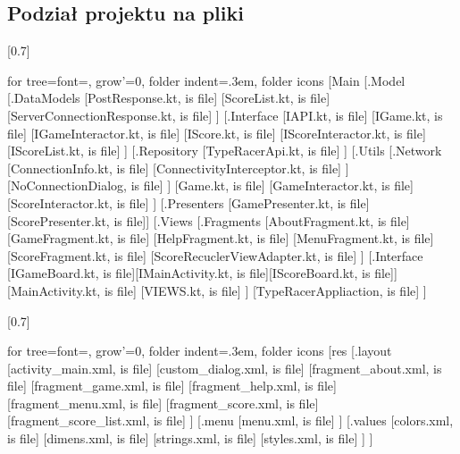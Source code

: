 \documentclass[12pt,a4paper]{article}
\begin{document}
		\subsection{Podział projektu na pliki}
		\begin{multicols}{2}
\scalebox{0.7}[0.7]{
			\begin{forest}
				for tree={font=\sffamily, grow'=0,
    folder indent=.3em, folder icons}
    	[Main
    	    [.Model
    	        [.DataModels
    	        [PostResponse.kt, is file]
    	        [ScoreList.kt, is file]
    	        [ServerConnectionResponse.kt, is file]
    	        ]
    	        [.Interface
    	        [IAPI.kt, is file]
    	        [IGame.kt, is file]
    	        [IGameInteractor.kt, is file]
    	        [IScore.kt, is file]
    	        [IScoreInteractor.kt, is file]
    	        [IScoreList.kt, is file]
    	        ]
    	        [.Repository
    	        [TypeRacerApi.kt, is file]
    	        ]
    	        [.Utils
    	            [.Network
    	            [ConnectionInfo.kt, is file]
    	            [ConnectivityInterceptor.kt, is file]
    	            ]
    	        [NoConnectionDialog, is file]
    	        ]
    	        [Game.kt, is file]
    	        [GameInteractor.kt, is file]
    	        [ScoreInteractor.kt, is file]
    	    ]
    	    [.Presenters
    	    [GamePresenter.kt, is file][ScorePresenter.kt, is file]]
    	    [.Views
    	    [.Fragments
    	    [AboutFragment.kt, is file]
    	    [GameFragment.kt, is file]
    	    [HelpFragment.kt, is file]
    	    [MenuFragment.kt, is file]
    	    [ScoreFragment.kt, is file]
    	    [ScoreRecuclerViewAdapter.kt, is file]
    	    ]
    	    [.Interface [IGameBoard.kt, is file][IMainActivity.kt, is file][IScoreBoard.kt, is file]]
    	    [MainActivity.kt, is file]
    	    [VIEWS.kt, is file]
    	    ]
    	    [TypeRacerAppliaction, is file]
    	]
			\end{forest}
			}
\scalebox{0.7}[0.7]{
			\begin{forest}
				for tree={font=\sffamily, grow'=0,
                folder indent=.3em, folder icons}
    [res
        [.layout 
            [activity\_main.xml, is file]
            [custom\_dialog.xml, is file]
            [fragment\_about.xml, is file]
            [fragment\_game.xml, is file]
            [fragment\_help.xml, is file]
            [fragment\_menu.xml, is file]
            [fragment\_score.xml, is file]
            [fragment\_score\_list.xml, is file]
        ]
        [.menu 
            [menu.xml, is file]
        ]
        [.values
            [colors.xml, is file]
            [dimens.xml, is file]
            [strings.xml, is file]
            [styles.xml, is file]
        ]
    ]
    \end{forest}
}
		\end{multicols}
\clearpage 
\end{document}
